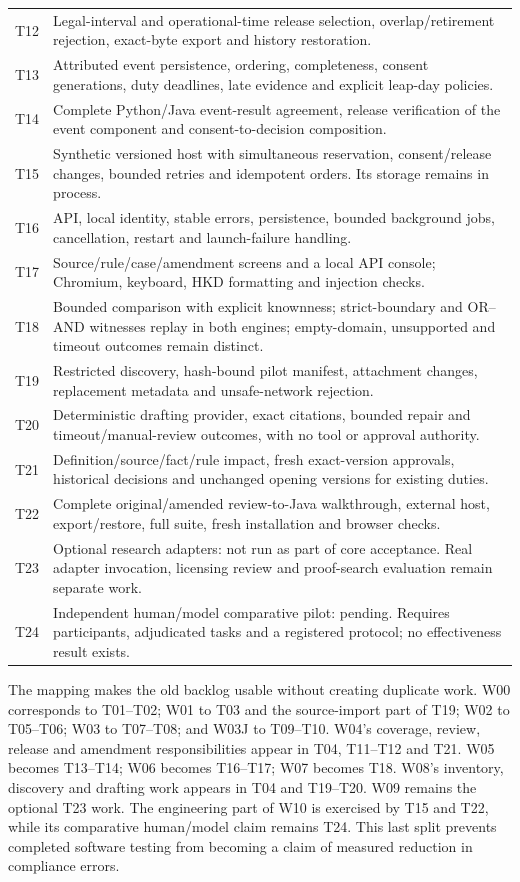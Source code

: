 \begin{longtable}{@{}P{0.09\textwidth}P{0.86\textwidth}@{}}
T12 & Legal-interval and operational-time release selection, overlap/retirement rejection, exact-byte export and history restoration.\\
T13 & Attributed event persistence, ordering, completeness, consent generations, duty deadlines, late evidence and explicit leap-day policies.\\
T14 & Complete Python/Java event-result agreement, release verification of the event component and consent-to-decision composition.\\
T15 & Synthetic versioned host with simultaneous reservation, consent/release changes, bounded retries and idempotent orders. Its storage remains in process.\\
T16 & API, local identity, stable errors, persistence, bounded background jobs, cancellation, restart and launch-failure handling.\\
T17 & Source/rule/case/amendment screens and a local API console; Chromium, keyboard, HKD formatting and injection checks.\\
T18 & Bounded comparison with explicit knownness; strict-boundary and OR--AND witnesses replay in both engines; empty-domain, unsupported and timeout outcomes remain distinct.\\
T19 & Restricted discovery, hash-bound pilot manifest, attachment changes, replacement metadata and unsafe-network rejection.\\
T20 & Deterministic drafting provider, exact citations, bounded repair and timeout/manual-review outcomes, with no tool or approval authority.\\
T21 & Definition/source/fact/rule impact, fresh exact-version approvals, historical decisions and unchanged opening versions for existing duties.\\
T22 & Complete original/amended review-to-Java walkthrough, external host, export/restore, full suite, fresh installation and browser checks.\\
T23 & Optional research adapters: not run as part of core acceptance. Real adapter invocation, licensing review and proof-search evaluation remain separate work.\\
T24 & Independent human/model comparative pilot: pending. Requires participants, adjudicated tasks and a registered protocol; no effectiveness result exists.\\
\bottomrule
\end{longtable}
\endgroup

The mapping makes the old backlog usable without creating duplicate work.
W00 corresponds to T01--T02; W01 to T03 and the source-import part of T19;
W02 to T05--T06; W03 to T07--T08; and W03J to T09--T10. W04's coverage,
review, release and amendment responsibilities appear in T04, T11--T12 and
T21. W05 becomes T13--T14; W06 becomes T16--T17; W07 becomes T18.
W08's inventory, discovery and drafting work appears in T04 and T19--T20.
W09 remains the optional T23 work. The engineering part of W10 is exercised
by T15 and T22, while its comparative human/model claim remains T24. This
last split prevents completed software testing from becoming a claim of
measured reduction in compliance errors.

